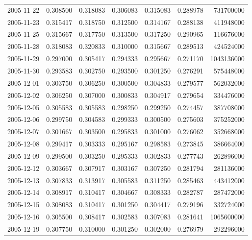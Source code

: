 \begin{tabular}{lrrrrrr}
2005-11-22 &    0.308500 &    0.318083 &    0.306083 &    0.315083 &    0.288978 &   731700000 \\
2005-11-23 &    0.315417 &    0.318750 &    0.312500 &    0.314167 &    0.288138 &   411948000 \\
2005-11-25 &    0.315667 &    0.317750 &    0.313500 &    0.317250 &    0.290965 &   116676000 \\
2005-11-28 &    0.318083 &    0.320833 &    0.310000 &    0.315667 &    0.289513 &   424524000 \\
2005-11-29 &    0.297000 &    0.305417 &    0.294333 &    0.295667 &    0.271170 &  1043136000 \\
2005-11-30 &    0.293583 &    0.302750 &    0.293500 &    0.301250 &    0.276291 &   575448000 \\
2005-12-01 &    0.303750 &    0.306250 &    0.300500 &    0.304833 &    0.279577 &   562032000 \\
2005-12-02 &    0.306250 &    0.307000 &    0.300833 &    0.304917 &    0.279654 &   334476000 \\
2005-12-05 &    0.305583 &    0.305583 &    0.298250 &    0.299250 &    0.274457 &   387708000 \\
2005-12-06 &    0.299750 &    0.304583 &    0.299333 &    0.300500 &    0.275603 &   375252000 \\
2005-12-07 &    0.301667 &    0.303500 &    0.295833 &    0.301000 &    0.276062 &   352668000 \\
2005-12-08 &    0.299417 &    0.303333 &    0.295167 &    0.298583 &    0.273845 &   386664000 \\
2005-12-09 &    0.299500 &    0.303250 &    0.295333 &    0.302833 &    0.277743 &   262896000 \\
2005-12-12 &    0.303667 &    0.307917 &    0.303167 &    0.307250 &    0.281794 &   281136000 \\
2005-12-13 &    0.307833 &    0.313917 &    0.305583 &    0.311250 &    0.285463 &   443412000 \\
2005-12-14 &    0.308917 &    0.310417 &    0.304667 &    0.308333 &    0.282787 &   287472000 \\
2005-12-15 &    0.308083 &    0.310417 &    0.301250 &    0.304417 &    0.279196 &   332724000 \\
2005-12-16 &    0.305500 &    0.308417 &    0.302583 &    0.307083 &    0.281641 &  1065600000 \\
2005-12-19 &    0.307750 &    0.310000 &    0.301250 &    0.302000 &    0.276979 &   292296000 \\

\end{tabular}
